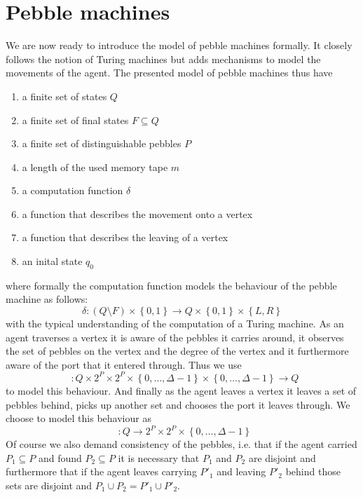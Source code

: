 \documentclass[draft,oneside]{scrartcl}
\DeclareMathOperator{\din}{\delta_{\mathit{in}}}
\DeclareMathOperator{\dout}{\delta_{\mathit{out}}}
\begin{document}
\section{Pebble machines}
We are now ready to introduce the model of pebble machines formally. It closely
follows the notion of Turing machines but adds mechanisms to model the
movements of the agent. The presented model of pebble machines thus have
\begin{enumerate}
  \item a finite set of states $Q$
  \item a finite set of final states $F\subseteq Q$
  \item a finite set of distinguishable pebbles $P$
  \item a length of the used memory tape $m$
  \item a computation function $\delta$
  \item a function that describes the movement onto a vertex
    $\din$
  \item a function that describes the leaving of a vertex $\dout$
  \item an inital state $q_{0}$
\end{enumerate}
where formally the computation function models the behaviour of the pebble
machine as follows:
\begin{equation*}
  \delta\colon (Q\setminus F)\times\left\{0,1\right\}\rightarrow
  Q\times\left\{0,1\right\}\times\left\{L,R\right\}
\end{equation*}
with the typical understanding of the computation of a Turing machine.
As an agent traverses a vertex it is aware of the pebbles it carries
around, it observes the set of pebbles on the vertex and the degree of the
vertex and it furthermore aware of the port that it entered through.
Thus we use
\begin{equation*}
  \din\colon Q\times 2^{P}\times 2^{P}\times
  \left\{0,\dots,\Delta - 1\right\}\times\left\{0,\dots,\Delta - 1\right\}
  \rightarrow Q
\end{equation*}
to model this behaviour. And finally as the agent leaves a vertex it leaves
a set of pebbles behind, picks up another set and chooses the port it leaves
through. We choose to model this behaviour as
\begin{equation*}
  \dout\colon Q
  \rightarrow 2^{P}\times 2^{P}\times \left\{0,\dots,\Delta - 1\right\}
\end{equation*}
Of course we also demand consistency of the pebbles, i.e. that if the agent
carried $P_{1}\subseteq P$ and found $P_{2}\subseteq P$ it is necessary that
$P_{1}$ and $P_{2}$ are disjoint and furthermore that if the agent leaves
carrying $P'_{1}$ and leaving $P'_{2}$ behind those sets are disjoint and
$P_{1}\cup P_{2} = P'_{1}\cup P'_{2}$.
\end{document}
